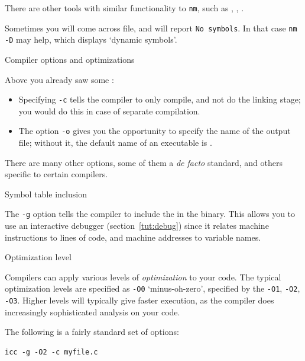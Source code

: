 
\begin{remark}
  There are other tools with similar functionality to \lstinline{nm},
  such as , , .  
\end{remark}

\begin{remark}
  Sometimes you will come across  file,
  and  will report \lstinline{No symbols}.
  In that case \lstinline{nm -D} may help, which displays `dynamic symbols'.
\end{remark}

 {Compiler options and optimizations}

Above you already saw some :
\begin{itemize}
\item Specifying \lstinline{-c} tells the compiler to only compile, and not do
  the linking stage; you would do this in case of separate
  compilation.
\item The option \lstinline{-o} gives you the opportunity to specify the name
  of the output file; without it, the default name of an executable is
  .
\end{itemize}

There are many other options, some of them a \emph{de facto} standard,
and others specific to certain compilers.

 {Symbol table inclusion}

The \lstinline{-g} option tells the compiler to include the  in the binary.  This allows you to use an interactive
debugger (section~\ref{tut:debug}) since it relates machine
instructions to lines of code, and machine addresses to variable
names.

 {Optimization level}

Compilers can apply various levels of
\emph{optimization} to your code. The
typical optimization levels are specified as \lstinline{-O0} `minus-oh-zero',
specified by the 
\lstinline{-O1}, \lstinline{-O2}, \lstinline{-O3}. Higher levels will typically give faster
execution, as the compiler does increasingly sophisticated analysis on
your code.

The following is a fairly standard set of options:
\begin{lstlisting}
icc -g -O2 -c myfile.c
\end{lstlisting}

